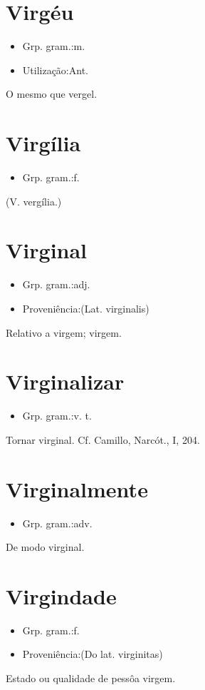 \documentclass{article}
\begin{document}
\section{Virgéu}
\begin{itemize}
\item {Grp. gram.:m.}
\end{itemize}
\begin{itemize}
\item {Utilização:Ant.}
\end{itemize}
O mesmo que \textunderscore vergel\textunderscore .
\section{Virgília}
\begin{itemize}
\item {Grp. gram.:f.}
\end{itemize}
(V. \textunderscore vergília\textunderscore .)
\section{Virginal}
\begin{itemize}
\item {Grp. gram.:adj.}
\end{itemize}
\begin{itemize}
\item {Proveniência:(Lat. \textunderscore virginalis\textunderscore )}
\end{itemize}
Relativo a virgem; virgem.
\section{Virginalizar}
\begin{itemize}
\item {Grp. gram.:v. t.}
\end{itemize}
Tornar virginal. Cf. Camillo, \textunderscore Narcót.\textunderscore , I, 204.
\section{Virginalmente}
\begin{itemize}
\item {Grp. gram.:adv.}
\end{itemize}
De modo virginal.
\section{Virgindade}
\begin{itemize}
\item {Grp. gram.:f.}
\end{itemize}
\begin{itemize}
\item {Proveniência:(Do lat. \textunderscore virginitas\textunderscore )}
\end{itemize}
Estado ou qualidade de pessôa virgem.
\end{document}
